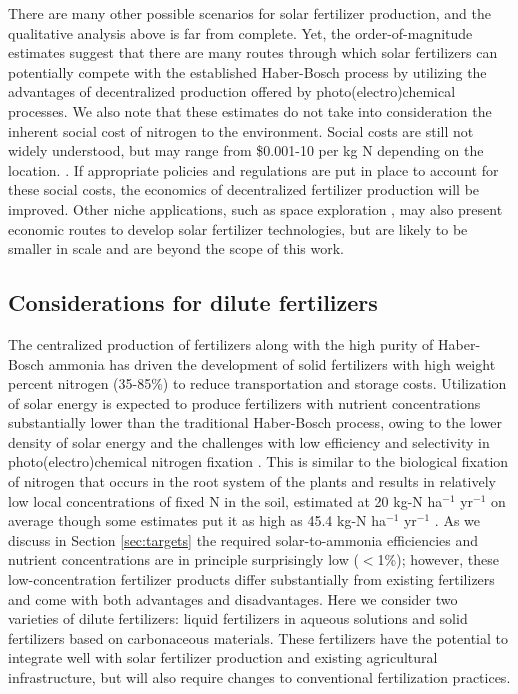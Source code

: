 There are many other possible scenarios for solar fertilizer production, and the qualitative analysis above is far from complete. Yet, the order-of-magnitude estimates suggest that there are many routes through which solar fertilizers can potentially compete with the established Haber-Bosch process by utilizing the advantages of decentralized production offered by photo(electro)chemical processes. We also note that these estimates do not take into consideration the inherent social cost of nitrogen to the environment. Social costs are still not widely understood, but may range from \$0.001-10 per kg N depending on the location. \cite{keeler2016social}. If appropriate policies and regulations are put in place to account for these social costs, the economics of decentralized fertilizer production will be improved. Other niche applications, such as space exploration \cite{Meyer_2016}, may also present economic routes to develop solar fertilizer technologies, but are likely to be smaller in scale and are beyond the scope of this work. 

\subsection{Considerations for dilute fertilizers}
\label{sec:dilute}

The centralized production of fertilizers along with the high purity of Haber-Bosch ammonia has driven the development of solid fertilizers with high weight percent nitrogen (35-85\%) to reduce transportation and storage costs. 
Utilization of solar energy is expected to produce fertilizers with nutrient concentrations substantially lower than the traditional Haber-Bosch process, owing to the lower density of solar energy \cite{MacKay_2013} and the challenges with low efficiency and selectivity in photo(electro)chemical nitrogen fixation \cite{Skulason_2012,Singh_2017}. This is similar to the biological fixation of nitrogen that occurs in the root system of the plants and results in relatively low local concentrations of fixed N in the soil, estimated at 20 kg-N ha$^{-1}$ yr$^{-1}$ on average \cite{Smil_1999_2,Unkovich_2009} though some estimates put it as high as 45.4 kg-N ha$^{-1}$ yr$^{-1}$ \cite{Herridge_2008}. As we discuss in Section \ref{sec:targets} the required solar-to-ammonia efficiencies and nutrient concentrations are in principle surprisingly low ($<$1\%); however, these low-concentration fertilizer products differ substantially from existing fertilizers and come with both advantages and disadvantages. Here we consider two varieties of dilute fertilizers: liquid fertilizers in aqueous solutions and solid fertilizers based on carbonaceous materials. These fertilizers have the potential to integrate well with solar fertilizer production and existing agricultural infrastructure, but will also require changes to conventional fertilization practices.

